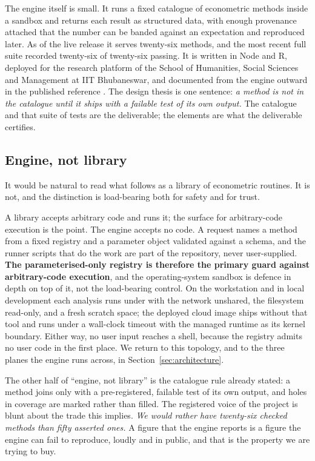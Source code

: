 The engine itself is small. It runs a fixed catalogue of econometric methods
inside a sandbox and returns each result as structured data, with enough
provenance attached that the number can be banded against an expectation and
reproduced later. As of the live release it serves twenty-six methods, and the
most recent full suite recorded twenty-six of twenty-six passing. It is written
in Node and R, deployed for the research platform of the School of Humanities,
Social Sciences and Management at IIT Bhubaneswar, and documented from the engine
outward in the published reference \cite{bhandari2026econstellar}. The design
thesis is one sentence: \emph{a method is not in the catalogue until it ships
with a failable test of its own output.} The catalogue and that suite of tests
are the deliverable; the elements are what the deliverable certifies.

\subsection{Engine, not library}

It would be natural to read what follows as a library of econometric routines.
It is not, and the distinction is load-bearing both for safety and for trust.

A library accepts arbitrary code and runs it; the surface for arbitrary-code
execution is the point. The engine accepts no code. A request names a method
from a fixed registry and a parameter object validated against a schema, and the
runner scripts that do the work are part of the repository, never user-supplied.
\textbf{The parameterised-only registry is therefore the primary guard against
arbitrary-code execution}, and the operating-system sandbox is defence in depth
on top of it, not the load-bearing control. On the workstation and in local
development each analysis runs under  with the network
unshared, the filesystem read-only, and a fresh scratch space; the deployed
cloud image ships without that tool and runs under a wall-clock timeout with the
managed runtime as its kernel boundary. Either way, no user input reaches a
shell, because the registry admits no user code in the first place. We return to
this topology, and to the three planes the engine runs across, in
Section~\ref{sec:architecture}.

The other half of ``engine, not library'' is the catalogue rule already stated:
a method joins only with a pre-registered, failable test of its own output, and
holes in coverage are marked rather than filled. The registered voice of the
project is blunt about the trade this implies. \emph{We would rather have
twenty-six checked methods than fifty asserted ones.} A figure that the engine
reports is a figure the engine can fail to reproduce, loudly and in public, and
that is the property we are trying to buy.

